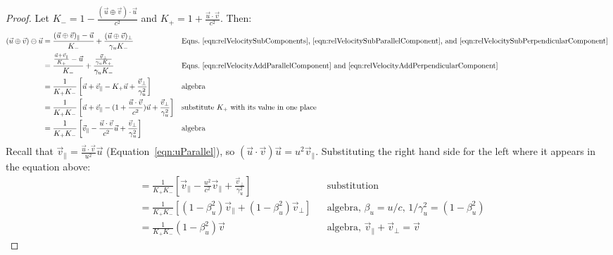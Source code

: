 \documentclass[a4paper]{article}
\theoremstyle{plain}
\theoremstyle{definition}
\newcommand{\vect}[1]{\vec{#1}}
\begin{document}
\begin{proof}
Let $K_{-} = 1 - \frac{(\vect{u} \oplus \vect{v}) \cdot \vect{u}}{c^2}$
and $K_{+} = 1 + \frac{\vect{u} \cdot \vect{v}}{c^2}$.
Then:
\begin{align}
(\vect{u} \oplus \vect{v}) \ominus \vect{u}
  & = \frac{(\vect{u} \oplus \vect{v})_{\parallel} - \vect{u}}{K_{-}} + \frac{(\vect{u} \oplus \vect{v})_{\perp}}{\gamma_u K_{-}} & & \text{Eqns.~\eqref{eqn:relVelocitySubComponents},~\eqref{eqn:relVelocitySubParallelComponent}, and~\eqref{eqn:relVelocitySubPerpendicularComponent} } \nonumber \\
  & = \frac{\frac{\vect{u} + \vect{v}_{\parallel}}{K_{+}} - \vect{u}}{K_{-}} + \frac{\frac{\vect{v}_{\perp}}{\gamma_u K_{+}}}{\gamma_u K_{-}} & & \text{Eqns.~\eqref{eqn:relVelocityAddParallelComponent} and~\eqref{eqn:relVelocityAddPerpendicularComponent} } \nonumber \\
  & = \frac{1}{K_{+}K_{-}} \left[ \vect{u} + \vect{v}_{\parallel} - K_{+} \vect{u} + \frac{\vect{v}_{\perp}}{\gamma_u^2} \right] & & \text{algebra} \nonumber \\
  & = \frac{1}{K_{+}K_{-}} \left[ \vect{u} + \vect{v}_{\parallel} - (1 + \frac{\vect{u} \cdot \vect{v}}{c^2}) \vect{u} + \frac{\vect{v}_{\perp}}{\gamma_u^2} \right] & & \text{substitute $K_{+}$ with its value in one place} \nonumber \\
  & = \frac{1}{K_{+}K_{-}} \left[ \vect{v}_{\parallel} - \frac{\vect{u} \cdot \vect{v}}{c^2} \vect{u} + \frac{\vect{v}_{\perp}}{\gamma_u^2} \right] & & \text{algebra} \nonumber
\end{align}
Recall that
$\vect{v}_{\parallel} = \frac{\vect{u} \cdot \vect{v}}{u^2} \vect{u}$
(Equation~\eqref{eqn:uParallel}), so
$(\vect{u} \cdot \vect{v}) \vect{u} = u^2 \vect{v}_{\parallel}$.
Substituting the right hand side for the left where it appears
in the equation above:
\begin{align}
  & = \frac{1}{K_{+}K_{-}} \left[ \vect{v}_{\parallel} - \frac{u^2}{c^2} \vect{v}_{\parallel} + \frac{\vect{v}_{\perp}}{\gamma_u^2} \right] & & \text{substitution} \nonumber \\
  & = \frac{1}{K_{+}K_{-}} \left[ (1-\beta_u^2) \vect{v}_{\parallel} + (1-\beta_u^2)\vect{v}_{\perp} \right] & & \text{algebra, $\beta_u = u/c$, $1/\gamma_u^2 = (1-\beta_u^2)$} \nonumber \\
  & = \frac{1}{K_{+}K_{-}} (1-\beta_u^2) \vect{v} & & \text{algebra, $\vect{v}_{\parallel} + \vect{v}_{\perp} = \vect{v}$} \label{eqn:penultimateResult}
\end{align}

\end{proof}
\end{document}
